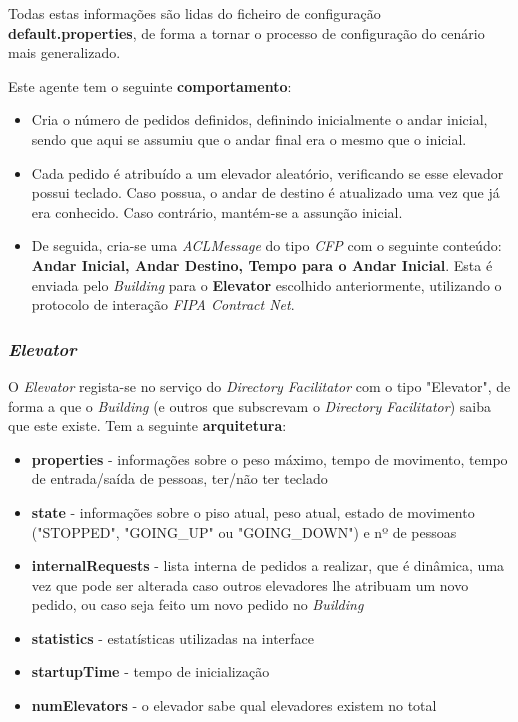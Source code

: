 \documentclass[a4paper]{article}
\begin{document}
Todas estas informações são lidas do ficheiro de configuração \textbf{default.properties}, de forma a tornar o processo de configuração do cenário mais generalizado.

Este agente tem o seguinte \textbf{comportamento}:

\begin{itemize}
\item Cria o número de pedidos definidos, definindo inicialmente o andar inicial, sendo que aqui se assumiu que o andar final era o mesmo que o inicial. 
\item Cada pedido é atribuído a um elevador aleatório, verificando se esse elevador possui teclado. Caso possua, o andar de destino é atualizado uma vez que já era conhecido. Caso contrário, mantém-se a assunção inicial. 
\item De seguida, cria-se uma \textit{ACLMessage} do tipo \textit{CFP} com o seguinte conteúdo: \textbf{Andar Inicial, Andar Destino, Tempo para o Andar Inicial}. Esta é enviada pelo \textit{Building} para o \textbf{Elevator} escolhido anteriormente, utilizando o protocolo de interação \textit{FIPA Contract Net}.
\end{itemize}

\subsubsection {\textit{Elevator}}

O \textit{Elevator} regista-se no serviço do \textit{Directory Facilitator} com o tipo "Elevator", de forma a que o \textit{Building} (e outros que subscrevam o \textit{Directory Facilitator}) saiba que este existe. Tem a seguinte \textbf{arquitetura}:

\begin{itemize}
\item \textbf{properties} -  informações sobre o peso máximo, tempo de movimento, tempo de entrada/saída de pessoas, ter/não ter teclado
\item \textbf{state} - informações sobre o piso atual, peso atual, estado de movimento ("STOPPED", "GOING\_UP" ou "GOING\_DOWN") e nº de pessoas
\item \textbf{internalRequests} - lista interna de pedidos a realizar, que é dinâmica, uma vez que pode ser alterada caso outros elevadores lhe atribuam um novo pedido, ou caso seja feito um novo pedido no \textit{Building}
\item \textbf{statistics} - estatísticas utilizadas na interface
\item \textbf{startupTime} - tempo de inicialização
\item \textbf{numElevators} - o elevador sabe qual elevadores existem no total
\end{itemize}
\end{document}
